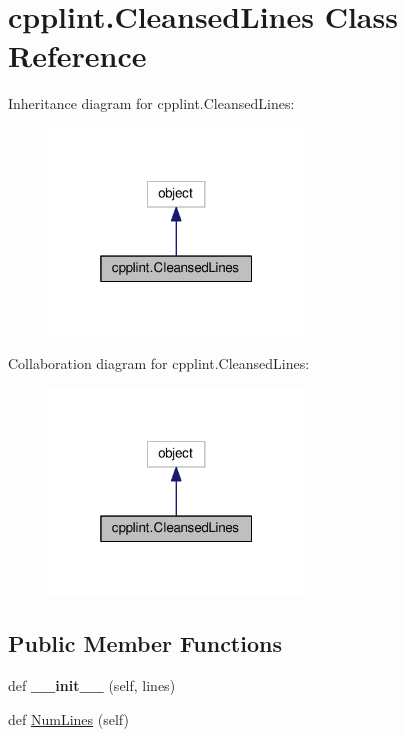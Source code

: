 \hypertarget{classcpplint_1_1CleansedLines}{}\section{cpplint.\+Cleansed\+Lines Class Reference}
\label{classcpplint_1_1CleansedLines}


Inheritance diagram for cpplint.\+Cleansed\+Lines\+:
\nopagebreak
\begin{figure}[H]
\begin{center}
\leavevmode
\includegraphics[width=193pt]{classcpplint_1_1CleansedLines__inherit__graph}
\end{center}
\end{figure}


Collaboration diagram for cpplint.\+Cleansed\+Lines\+:
\nopagebreak
\begin{figure}[H]
\begin{center}
\leavevmode
\includegraphics[width=193pt]{classcpplint_1_1CleansedLines__coll__graph}
\end{center}
\end{figure}
\subsection*{Public Member Functions}
\begin{DoxyCompactItemize}
\item 
def {\bfseries \+\_\+\+\_\+init\+\_\+\+\_\+} (self, lines)\hypertarget{classcpplint_1_1CleansedLines_ad2bc06d9697e2bbfbc7e6b50878c8c8f}{}\label{classcpplint_1_1CleansedLines_ad2bc06d9697e2bbfbc7e6b50878c8c8f}

\item 
def \hyperlink{classcpplint_1_1CleansedLines_a26a7eff70493d64d58d16f4a406c7ee9}{Num\+Lines} (self)
\end{DoxyCompactItemize}
